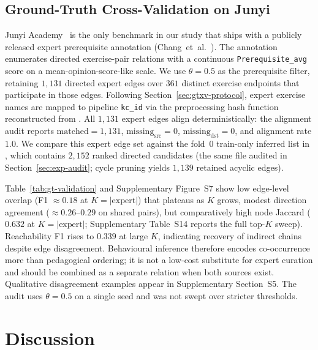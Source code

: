 \documentclass[preprint,10pt,doubleblind]{elsarticle}
\begin{document}
\subsection{Ground-Truth Cross-Validation on Junyi}
\label{sec:exp-gtxv}
Junyi Academy~\cite{junyi_dataset} is the only benchmark in our study
that ships with a publicly released expert prerequisite annotation
(Chang~et~al.~\cite{chang2015junyi}). The annotation enumerates directed exercise-pair
relations with a continuous \texttt{Prerequisite\_avg} score on a
mean-opinion-score-like scale. We use $\theta=0.5$ as the prerequisite
filter, retaining $1{,}131$ directed expert edges over $361$ distinct
exercise endpoints that participate in those edges. Following Section~\ref{sec:gtxv-protocol}, expert
exercise names are mapped to pipeline \texttt{kc\_id} via the
preprocessing hash function reconstructed from
. All $1{,}131$ expert
edges align deterministically: the alignment audit reports
$\text{matched}=1{,}131$, $\text{missing}_{\text{src}}=0$,
$\text{missing}_{\text{dst}}=0$, and alignment rate $1.0$. We compare
this expert edge set against the fold~0 train-only inferred list in
, which contains $2{,}152$ ranked directed
candidates (the same file audited in Section~\ref{sec:exp-audit}; cycle
pruning yields $1{,}139$ retained acyclic edges).



Table~\ref{tab:gt-validation} and Supplementary Figure~S7
show low edge-level overlap (F1 $\approx 0.18$ at
$K{=}|\text{expert}|$) that plateaus as $K$ grows, modest direction agreement
($\approx 0.26$--$0.29$ on shared pairs), but comparatively high node Jaccard
($0.632$ at $K{=}|\text{expert}|$; Supplementary Table~S14 reports the full
top-$K$ sweep). Reachability F1 rises to $0.339$ at large $K$, indicating
recovery of indirect chains despite edge disagreement. Behavioural inference
therefore encodes co-occurrence more than pedagogical ordering; it is not a
low-cost substitute for expert curation and should be combined as a separate
relation when both sources exist. Qualitative disagreement examples appear in
Supplementary Section~S5. The audit uses $\theta{=}0.5$ on a single seed and
was not swept over stricter thresholds.
\section{Discussion}
\label{sec:disc}
\end{document}
